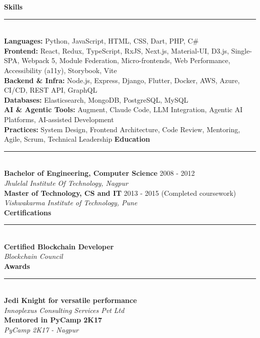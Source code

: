 \documentclass[a4paper,10pt]{article}
\begin{document}
\vspace{0.5pt}
{\large\bfseries Skills}\\[-2pt]
\rule{\linewidth}{0.4pt}\\[2pt]
\textbf{Languages:} Python, JavaScript, HTML, CSS, Dart, PHP, C\#\\
\textbf{Frontend:} React, Redux, TypeScript, RxJS, Next.js, Material-UI, D3.js, Single-SPA, Webpack 5, Module Federation, Micro-frontends, Web Performance, Accessibility (a11y), Storybook, Vite\\
\textbf{Backend \& Infra:} Node.js, Express, Django, Flutter, Docker, AWS, Azure, CI/CD, REST API, GraphQL\\
\textbf{Databases:} Elasticsearch, MongoDB, PostgreSQL, MySQL\\
\textbf{AI \& Agentic Tools:} Augment, Claude Code, LLM Integration, Agentic AI Platforms, AI-assisted Development\\
\textbf{Practices:} System Design, Frontend Architecture, Code Review, Mentoring, Agile, Scrum, Technical Leadership
\vspace{0.5pt}
{\large\bfseries Education}\\[-2pt]
\rule{\linewidth}{0.4pt}\\[2pt]
\textbf{Bachelor of Engineering, Computer Science} \hfill 2008 - 2012\\
\textit{\small Jhulelal Institute Of Technology, Nagpur}\\[4pt]
\textbf{Master of Technology, CS and IT} \hfill 2013 - 2015 (Completed coursework)\\
\textit{\small Vishwakarma Institute of Technology, Pune}\\[4pt]
\vspace{0.5pt}
{\large\bfseries Certifications}\\[-2pt]
\rule{\linewidth}{0.4pt}\\[2pt]
\textbf{Certified Blockchain Developer}\\
\textit{\small Blockchain Council}\\[4pt]
\vspace{0.5pt}
{\large\bfseries Awards}\\[-2pt]
\rule{\linewidth}{0.4pt}\\[2pt]
\textbf{Jedi Knight for versatile performance}\\
\textit{\small Innoplexus Consulting Services Pvt Ltd}\\[4pt]
\textbf{Mentored in PyCamp 2K17}\\
\textit{\small PyCamp 2K17 - Nagpur}\\[4pt]
\end{document}
